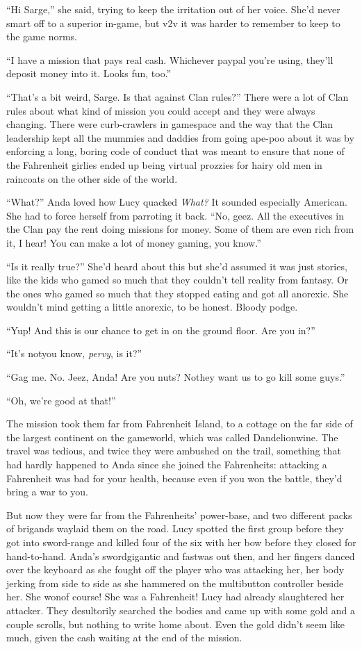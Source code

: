 “Hi Sarge,” she said, trying to keep the irritation out of her
voice. She’d never smart off to a superior in-game, but v2v it was
harder to remember to keep to the game norms.

“I have a mission that pays real cash. Whichever paypal you’re
using, they’ll deposit money into it. Looks fun, too.”

“That’s a bit weird, Sarge. Is that against Clan rules?” There were
a lot of Clan rules about what kind of mission you could accept and
they were always changing. There were curb-crawlers in gamespace
and the way that the Clan leadership kept all the mummies and
daddies from going ape-poo about it was by enforcing a long, boring
code of conduct that was meant to ensure that none of the
Fahrenheit girlies ended up being virtual prozzies for hairy old
men in raincoats on the other side of the world.

“What?” Anda loved how Lucy quacked \emph{What?} It sounded
especially American. She had to force herself from parroting it
back. “No, geez. All the executives in the Clan pay the rent doing
missions for money. Some of them are even rich from it, I hear! You
can make a lot of money gaming, you know.”

“Is it really true?” She’d heard about this but she’d assumed it
was just stories, like the kids who gamed so much that they
couldn’t tell reality from fantasy. Or the ones who gamed so much
that they stopped eating and got all anorexic. She wouldn’t mind
getting a little anorexic, to be honest. Bloody podge.

“Yup! And this is our chance to get in on the ground floor. Are you
in?”

“It’s not\dash{}you know, \emph{pervy}, is it?”

“Gag me. No. Jeez, Anda! Are you nuts? No\dash{}they want us to go kill
some guys.”

“Oh, we’re good at that!”

\tb

The mission took them far from Fahrenheit Island, to a cottage on
the far side of the largest continent on the gameworld, which was
called Dandelionwine. The travel was tedious, and twice they were
ambushed on the trail, something that had hardly happened to Anda
since she joined the Fahrenheits: attacking a Fahrenheit was bad
for your health, because even if you won the battle, they’d bring a
war to you.

But now they were far from the Fahrenheits’ power-base, and two
different packs of brigands waylaid them on the road. Lucy spotted
the first group before they got into sword-range and killed four of
the six with her bow before they closed for hand-to-hand. Anda’s
sword\dash{}gigantic and fast\dash{}was out then, and her fingers danced over
the keyboard as she fought off the player who was attacking her,
her body jerking from side to side as she hammered on the
multibutton controller beside her. She won\dash{}of course! She was a
Fahrenheit! Lucy had already slaughtered her attacker. They
desultorily searched the bodies and came up with some gold and a
couple scrolls, but nothing to write home about. Even the gold
didn’t seem like much, given the cash waiting at the end of the
mission.

